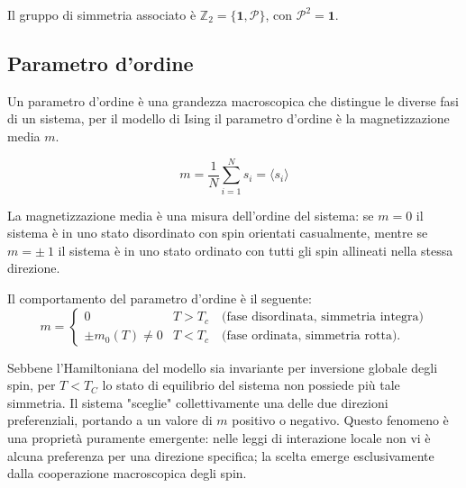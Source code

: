 Il gruppo di simmetria associato è $\mathbb{Z}_2 = \{\mathbf{1}, \mathcal{P}\}$,
con $\mathcal{P}^2 = \mathbf{1}$.

\subsection{Parametro d’ordine}
Un parametro d’ordine è una grandezza macroscopica che distingue le diverse fasi di un sistema, per il modello di Ising
il parametro d’ordine è la magnetizzazione media $m$. 

\begin{equation}
m = \frac{1}{N} \sum_{i=1}^{N} s_i = \langle s_i \rangle
\end{equation}

La magnetizzazione media è una misura dell'ordine del sistema:
se $m=0$ il sistema è in uno stato disordinato con spin orientati casualmente, 
mentre se $m= \pm \ 1$ il sistema è in uno stato ordinato con tutti gli spin allineati nella stessa direzione.

Il comportamento del parametro d’ordine è il seguente:
\begin{equation}
m =
\begin{cases}
0 & T > T_c \quad \text{(fase disordinata, simmetria integra)} \\[6pt]
\pm m_0(T) \neq 0 & T < T_c \quad \text{(fase ordinata, simmetria rotta)} .
\end{cases}
\end{equation}

Sebbene l'Hamiltoniana del modello sia invariante per inversione globale degli spin, 
per $T<T_C$ lo stato di equilibrio del sistema non possiede più tale simmetria. Il sistema "sceglie" 
collettivamente una delle due direzioni preferenziali, portando a un valore di $m$ positivo o negativo. Questo fenomeno 
è una proprietà puramente emergente: nelle leggi di interazione locale non vi è alcuna preferenza per una direzione specifica; 
la scelta emerge esclusivamente dalla cooperazione macroscopica degli spin.